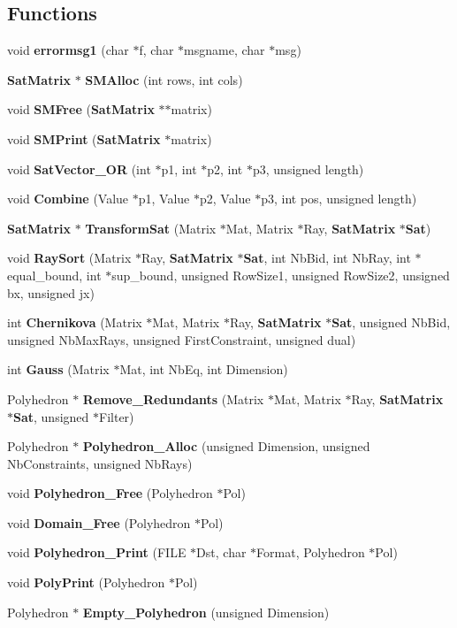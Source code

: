 \subsection*{Functions}
\begin{CompactItemize}
\item 
void {\bf errormsg1} (char $\ast$f, char $\ast$msgname, char $\ast$msg)
\item 
{\bf Sat\-Matrix} $\ast$ {\bf SMAlloc} (int rows, int cols)
\item 
void {\bf SMFree} ({\bf Sat\-Matrix} $\ast$$\ast$matrix)
\item 
void {\bf SMPrint} ({\bf Sat\-Matrix} $\ast$matrix)
\item 
void {\bf Sat\-Vector\_\-OR} (int $\ast$p1, int $\ast$p2, int $\ast$p3, unsigned length)
\item 
void {\bf Combine} (Value $\ast$p1, Value $\ast$p2, Value $\ast$p3, int pos, unsigned length)
\item 
{\bf Sat\-Matrix} $\ast$ {\bf Transform\-Sat} (Matrix $\ast$Mat, Matrix $\ast$Ray, {\bf Sat\-Matrix} $\ast${\bf Sat})
\item 
void {\bf Ray\-Sort} (Matrix $\ast$Ray, {\bf Sat\-Matrix} $\ast${\bf Sat}, int Nb\-Bid, int Nb\-Ray, int $\ast$equal\_\-bound, int $\ast$sup\_\-bound, unsigned Row\-Size1, unsigned Row\-Size2, unsigned bx, unsigned jx)
\item 
int {\bf Chernikova} (Matrix $\ast$Mat, Matrix $\ast$Ray, {\bf Sat\-Matrix} $\ast${\bf Sat}, unsigned Nb\-Bid, unsigned Nb\-Max\-Rays, unsigned First\-Constraint, unsigned dual)
\item 
int {\bf Gauss} (Matrix $\ast$Mat, int Nb\-Eq, int Dimension)
\item 
Polyhedron $\ast$ {\bf Remove\_\-Redundants} (Matrix $\ast$Mat, Matrix $\ast$Ray, {\bf Sat\-Matrix} $\ast${\bf Sat}, unsigned $\ast$Filter)
\item 
Polyhedron $\ast$ {\bf Polyhedron\_\-Alloc} (unsigned Dimension, unsigned Nb\-Constraints, unsigned Nb\-Rays)
\item 
void {\bf Polyhedron\_\-Free} (Polyhedron $\ast$Pol)
\item 
void {\bf Domain\_\-Free} (Polyhedron $\ast$Pol)
\item 
void {\bf Polyhedron\_\-Print} (FILE $\ast$Dst, char $\ast$Format, Polyhedron $\ast$Pol)
\item 
void {\bf Poly\-Print} (Polyhedron $\ast$Pol)
\item 
Polyhedron $\ast$ {\bf Empty\_\-Polyhedron} (unsigned Dimension)
\item 
$$
\end{CompactItemize}
